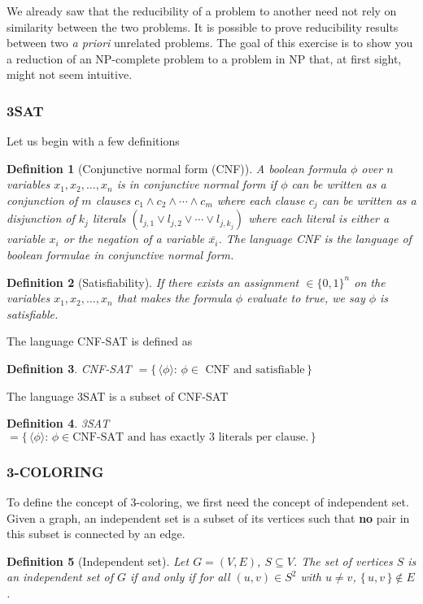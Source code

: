 \documentclass{article}
\newcommand{\definitionname}{Definition}
\newtheorem{definition}{\definitionname}
\newcommand{\st}{\colon\,}
\begin{document}
We already saw that the reducibility of a problem to
another need not rely on similarity between the two problems. It is
possible to prove reducibility results between two \emph{a priori} unrelated problems.
The goal of this exercise is to show you a reduction of an NP-complete
problem to a problem in NP that, at first sight, might not seem intuitive.

\subsubsection{3SAT} Let us begin with a few definitions
\begin{definition}[Conjunctive normal form (CNF)]
	A boolean formula $\phi$ over $n$ variables $x_1,x_2,\ldots,x_n$ is in
	conjunctive normal form if $\phi$ can be
	written as a conjunction of $m$ clauses $c_1 \land c_2 \land \cdots \land
	c_m$ where each clause $c_j$ can be written as a disjunction of
	$k_j$ literals
	$(l_{j,1} \lor l_{j,2} \lor \cdots \lor l_{j,k_j})$ where each literal is
	either a variable $x_i$ or the negation of a variable $\bar{x_i}$.
	The language CNF is the language of boolean formulae in conjunctive normal
	form.
\end{definition}

\begin{definition}[Satisfiability]
  If there exists an
  assignment $\in \{0,1\}^n$ on the variables $x_1,x_2,\ldots,x_n$ that
  makes the formula $\phi$ evaluate to true, we say $\phi$ is
  \emph{satisfiable}.
\end{definition}

The language CNF-SAT is defined as
\begin{definition}
  CNF-SAT $= \{\, \langle \phi \rangle \st \text{$\phi \in$ CNF and satisfiable}\,\}$
\end{definition}

The language 3SAT is a subset of CNF-SAT
\begin{definition}
  3SAT $= \{\,\langle \phi \rangle \st \phi \in \text{CNF-SAT and has
  exactly 3 literals per clause.}\,\}$
\end{definition}

\subsubsection{3-COLORING}
To define the concept of 3-coloring, we first need the concept of independent set.
Given a graph, an independent set is a subset of its vertices such that
\textbf{no} pair in this subset is connected by an edge.
\begin{definition}[Independent set]
  Let $G=(V,E)$, $S\subseteq V$. The set of vertices $S$ is an independent set
  of $G$ if and only if for all $(u,v) \in S^2$ with $u\ne v$, $\{\,u,v\,\} \not\in E$.
\end{definition}
\end{document}
